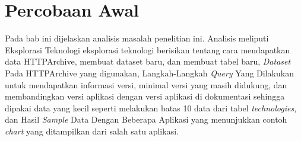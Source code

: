 \chapter{Percobaan Awal}
\label{chap:percobaan_awal}
Pada bab ini dijelaskan analisis masalah penelitian ini. Analisis meliputi Eksplorasi Teknologi eksplorasi teknologi berisikan tentang cara mendapatkan data HTTPArchive, membuat dataset baru, dan membuat tabel baru, \textit{Dataset} Pada HTTPArchive yang digunakan, Langkah-Langkah \textit{Query} Yang Dilakukan untuk mendapatkan informasi versi, minimal versi yang masih didukung, dan membandingkan versi aplikasi dengan versi aplikasi di dokumentasi sehingga dipakai data yang kecil seperti melakukan batas 10 data dari tabel \textit{technologies}, dan Hasil \textit{Sample} Data Dengan Beberapa Aplikasi yang menunjukkan contoh \textit{chart} yang ditampilkan dari salah satu aplikasi.

